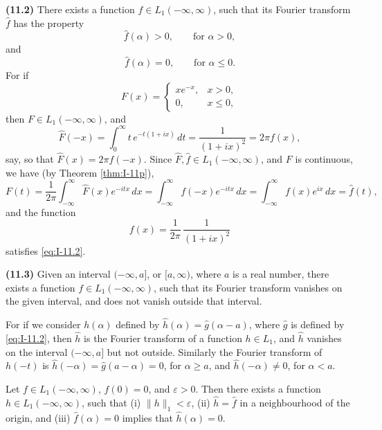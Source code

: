 \noindent\textbf{(11.2)} There exists a function $f\in L_1(-\infty,\infty)$, such that its Fourier transform $\widehat f$ has the property
\begin{equation}\label{eq:I-11.2}\tag{11.2}
\widehat f(\alpha)>0,\qquad\text{for }\alpha>0,
\end{equation}
and
\begin{equation*}
\widehat f(\alpha)=0,\qquad\text{for }\alpha\le 0.
\end{equation*}
For if
\begin{equation*}
F(x)=
\begin{cases}
xe^{-x},&x>0,\\
0,&x\le 0,
\end{cases}
\end{equation*}
then $F\in L_1(-\infty,\infty)$, and
\begin{equation*}
\widehat F(-x)=\int_{0}^{\infty}t\,e^{-t(1+ix)}\,dt=\frac{1}{(1+ix)^{2}}=2\pi f(x),
\end{equation*}
say, so that $\widehat F(x)=2\pi f(-x)$. Since $\widehat F,\widehat f\in L_1(-\infty,\infty)$, and $F$ is continuous, we have (by Theorem \ref{thm:I-11p}),
\begin{equation*}
F(t)=\frac{1}{2\pi}\int_{-\infty}^{\infty}\widehat F(x)e^{-itx}\,dx
=\int_{-\infty}^{\infty}f(-x)e^{-itx}\,dx
=\int_{-\infty}^{\infty}f(x)e^{ix}\,dx
=\widehat f(t),
\end{equation*}
and the function
\begin{equation*}
f(x)=\frac{1}{2\pi}\,\frac{1}{(1+ix)^{2}}
\end{equation*}
satisfies \eqref{eq:I-11.2}.

\noindent\textbf{(11.3)} Given an interval $(-\infty,a]$, or $[a,\infty)$, where $a$ is a real number, there exists a function $f\in L_1(-\infty,\infty)$, such that its Fourier transform vanishes on the given interval, and does not vanish outside that interval.

For if we consider $h(\alpha)$ defined by $\widehat h(\alpha)=\widehat g(\alpha-a)$, where $\widehat g$ is defined by \eqref{eq:I-11.2}, then $\widehat h$ is the Fourier transform of a function $h\in L_1$, and $\widehat h$ vanishes on the interval $(-\infty,a]$ but not outside. Similarly the Fourier transform of $h(-t)$ is $\widehat h(-\alpha)=\widehat g(a-\alpha)=0$, for $\alpha\ge a$, and $\widehat h(-\alpha)\neq 0$, for $\alpha<a$.

\begin{theorem}\label{thm:I-19}
Let $f\in L_1(-\infty,\infty)$, $f(0)=0$, and $\varepsilon>0$. Then there exists a function $h\in L_1(-\infty,\infty)$, such that (i) $\|h\|_1<\varepsilon$, (ii) $\widehat h=\widehat f$ in a neighbourhood of the origin, and (iii) $\widehat f(\alpha)=0$ implies that $\widehat h(\alpha)=0$.
\end{theorem}

